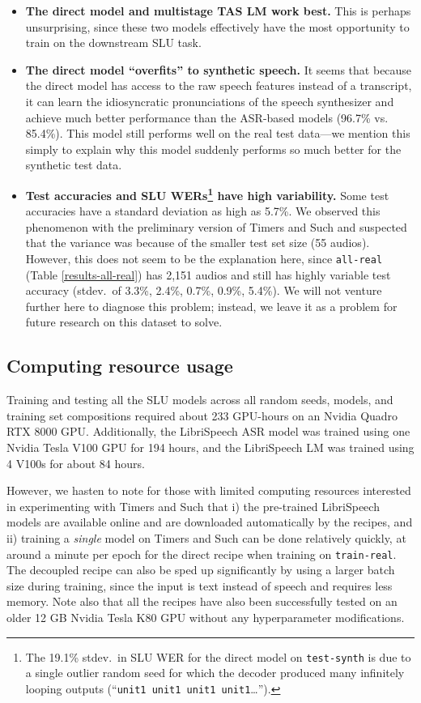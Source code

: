 \documentclass{article}
\begin{document}
\begin{itemize}
\item \textbf{The direct model and multistage TAS LM work best.} This is perhaps unsurprising, since these two models effectively have the most opportunity to train on the downstream SLU task. 



\item \textbf{The direct model ``overfits'' to synthetic speech.} It seems that because the direct model has access to the raw speech features instead of a transcript, it can learn the idiosyncratic pronunciations of the speech synthesizer and achieve much better performance than the ASR-based models (96.7\% vs. 85.4\%). This model still performs well on the real test data---we mention this simply to explain why this model suddenly performs so much better for the synthetic test data.

\item \textbf{Test accuracies and SLU WERs\footnote{The 19.1\% stdev.~in SLU WER for the direct model on \texttt{test-synth} is due to a single outlier random seed for which the decoder produced many infinitely looping outputs (``\texttt{unit1 unit1 unit1 unit1}\dots'').} have high variability.} Some test accuracies have a standard deviation as high as 5.7\%. We observed this phenomenon with the preliminary version of Timers and Such and suspected that the variance was because of the smaller test set size (55 audios). However, this does not seem to be the explanation here, since \texttt{all-real} (Table \ref{results-all-real}) has 2,151 audios and still has highly variable test accuracy (stdev.~of 3.3\%, 2.4\%, 0.7\%, 0.9\%, 5.4\%). 
We will not venture further here to diagnose this problem; instead, we leave it as a problem for future research on this dataset to solve.
\end{itemize}

\subsection{Computing resource usage}\label{compute-usage}
Training and testing all the SLU models across all random seeds, models, and training set compositions required about  233 GPU-hours on an Nvidia Quadro RTX 8000 GPU.
Additionally, the LibriSpeech ASR model was trained using one Nvidia Tesla V100 GPU for 194 hours, and the LibriSpeech LM was trained using 4 V100s for about 84 hours.

However, we hasten to note for those with limited computing resources interested in experimenting with Timers and Such that i) the pre-trained LibriSpeech models are available online and are downloaded automatically by the recipes, and ii) training a \textit{single} model on Timers and Such can be done relatively quickly, at around a minute per epoch for the direct recipe when training on \texttt{train-real}. The decoupled recipe can also be sped up significantly by using a larger batch size during training, since the input is text instead of speech and requires less memory. Note also that all the recipes have also been successfully tested on an older 12 GB Nvidia Tesla K80 GPU without any hyperparameter modifications.
\end{document}
